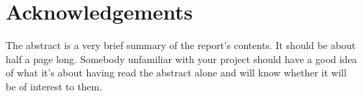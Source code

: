 \section*{Acknowledgements}
The abstract is a very brief summary of
the report's contents. It should be about half a
page long. Somebody unfamiliar with your
project should have a good idea of what it's
about having read the abstract alone and will
know whether it will be of interest to them.
